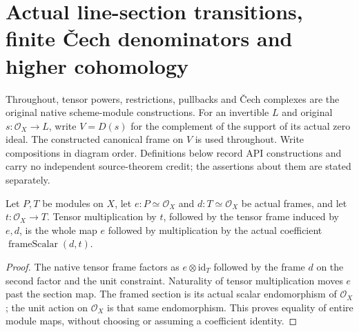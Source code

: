 \section{Actual line-section transitions, finite \v{C}ech denominators and higher cohomology}
\label{sec:cech-line-native-cohomology}

Throughout, tensor powers, restrictions, pullbacks and \v{C}ech complexes
are the original native scheme-module constructions. For an invertible
$L$ and original $s:\mathcal O_X\to L$, write $V=D(s)$ for the complement
of the support of its actual zero ideal. The constructed
canonical frame on $V$ is used throughout. Write compositions in diagram
order. Definitions below record API constructions and carry no independent
source-theorem credit; the assertions about them are stated separately.

\begin{lemma}
\label{lem:cech-line-native-two-frame-scalar}
\leanok
Let $P,T$ be modules on $X$, let $e:P\simeq\mathcal O_X$ and
$d:T\simeq\mathcal O_X$ be actual frames, and let $t:\mathcal O_X\to T$.
Tensor multiplication by $t$, followed by the tensor frame induced by
$e,d$, is the whole map $e$ followed by multiplication by the actual
coefficient $\operatorname{frameScalar}(d,t)$.
\end{lemma}
\begin{proof}
The native tensor frame factors as $e\otimes\mathrm{id}_T$ followed by
the frame $d$ on the second factor and the unit constraint. Naturality
of tensor multiplication moves $e$ past the section map. The framed
section is its actual scalar endomorphism of $\mathcal O_X$; the unit
action on $\mathcal O_X$ is that same endomorphism. This proves equality
of entire module maps, without choosing or assuming a coefficient identity.
\end{proof}

